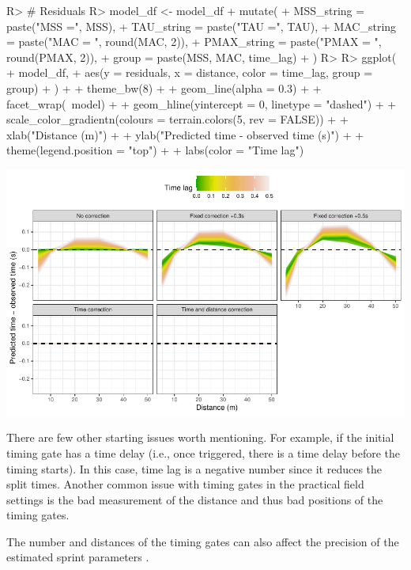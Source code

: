 \documentclass[
]{jss}
\begin{document}
\begin{CodeChunk}
\begin{CodeInput}
R> # Residuals
R> model_df <- model_df %
+   mutate(
+     MSS_string = paste("MSS =", MSS),
+     TAU_string = paste("TAU =", TAU),
+     MAC_string = paste("MAC = ", round(MAC, 2)),
+     PMAX_string = paste("PMAX = ", round(PMAX, 2)),
+     group = paste(MSS, MAC, time_lag)
+   )
R> 
R> ggplot(
+   model_df,
+   aes(y = residuals, x = distance, color = time_lag, group = group)
+ ) +
+   theme_bw(8) +
+   geom_line(alpha = 0.3) +
+   facet_wrap(~model) +
+   geom_hline(yintercept = 0, linetype = "dashed") +
+   scale_color_gradientn(colours = terrain.colors(5, rev = FALSE)) +
+   xlab("Distance (m)") +
+   ylab("Predicted time - observed time (s)")  +
+   theme(legend.position = "top") + 
+   labs(color = "Time lag")
\end{CodeInput}


\begin{center}\includegraphics[width=1\linewidth]{paper_files/figure-latex/unnamed-chunk-44-1} \end{center}

\end{CodeChunk}

There are few other starting issues worth mentioning. For example, if the initial timing gate has a time delay (i.e., once triggered, there is a time delay before the timing starts). In this case, time lag is a negative number since it reduces the split times. Another common issue with timing gates in the practical field settings is the bad measurement of the distance and thus bad positions of the timing gates.

The number and distances of the timing gates can also affect the precision of the estimated sprint parameters \citep{haugenPowerForceVelocityProfilingSprinting2020, haugenDifferenceStartImpact2012}.
\end{document}
